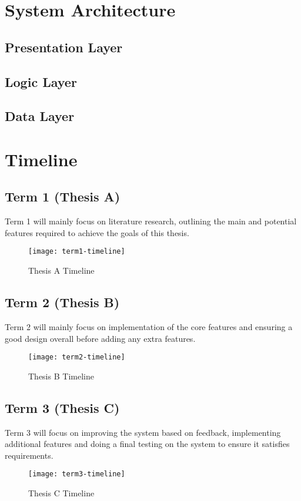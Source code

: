 \section{System Architecture}
\subsection{Presentation Layer}
\subsection{Logic Layer}
\subsection{Data Layer}


\section{Timeline}
\subsection{Term 1 (Thesis A)}
Term 1 will mainly focus on literature research, outlining the main and potential features required to achieve the goals of this thesis. 

\begin{figure}[h!]
\centering
\texttt{[image: term1-timeline]}
\caption{Thesis A Timeline}
\end{figure}

\subsection{Term 2 (Thesis B)}
Term 2 will mainly focus on implementation of the core features and ensuring a good design overall before adding any extra features. 

\begin{figure}[h!]
\centering
\texttt{[image: term2-timeline]}
\caption{Thesis B Timeline}
\end{figure}

\subsection{Term 3 (Thesis C)}
Term 3 will focus on improving the system based on feedback, implementing additional features and doing a final testing on the system to ensure it satisfies requirements. 

\begin{figure}[h!]
\centering
\texttt{[image: term3-timeline]}
\caption{Thesis C Timeline}
\end{figure}

